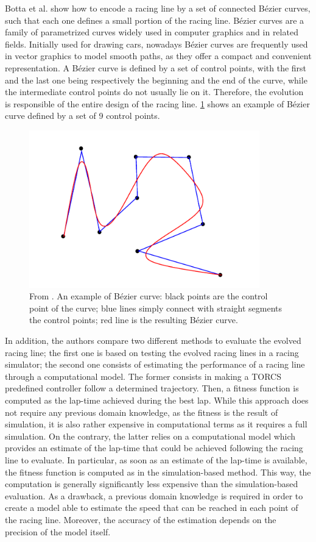 Botta et al. \cite{botta} show how to encode a racing line by a set of connected B\'{e}zier curves, such that each one defines a small portion of the racing line. B\'{e}zier curves are a family of parametrized curves widely used in computer graphics and in related fields. Initially used for drawing cars, nowadays B\'{e}zier curves are frequently used in vector graphics to model smooth paths, as they offer a compact and convenient representation.
A B\'{e}zier curve is defined by a set of control points, with the first and the last one being respectively the beginning and the end of the curve, while the intermediate control points do not usually lie on it. Therefore, the evolution is responsible of the entire design of the racing line. \ref{fig:bezier} shows an example of Bézier curve defined by
a set of 9 control points.
  \begin{figure}
    \centering
 	  \captionsetup{width=10cm}
      \includegraphics[width=10cm]{./img/bezier}
     \caption{From \cite{botta}. An example of B\'{e}zier curve: black points are the control point of the curve; blue lines simply connect with straight segments the control points; red line is the resulting B\'{e}zier curve.}
   \label{fig:bezier}
  \end{figure}
In addition, the authors compare two different methods to evaluate the evolved racing line; the first one is based on testing the evolved racing lines in a racing simulator; the second one consists of estimating the performance of a racing line through a computational model.
The former consists in making a TORCS predefined controller follow a determined trajectory. Then, a fitness function is computed as the lap-time achieved during the best lap. While this approach does not require any previous domain knowledge, as the fitness is the result of simulation, it is also rather expensive in computational terms as it requires a full simulation. 
On the contrary, the latter relies on a computational model which provides an estimate of the lap-time
that could be achieved following the racing line to evaluate. In particular, as soon as an estimate of the lap-time is available, the fitness function is computed as in the simulation-based method. This way, the computation is generally significantly less expensive than the simulation-based evaluation. As a drawback, a previous domain knowledge is required in order to create a model able to estimate the speed that can be reached in each point of the racing line. Moreover, the accuracy of the estimation depends on the precision of the model itself.

